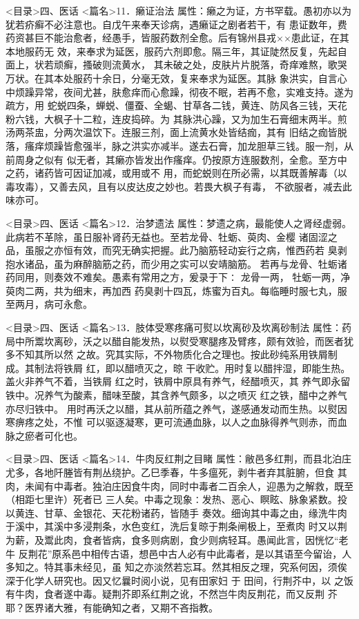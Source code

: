 \documentclass[a4paper,12pt,UTF8,twoside]{ctexbook}
\begin{document}
<目录>四、医话
<篇名>11．癞证治法
属性：癞之为证，方书罕载。愚初亦以为犹若疥癣不必注意也。自戊午来奉天诊病，遇癞证之剧者若干，有 
患证数年，费药资甚巨不能治愈者，经愚手，皆服药数剂全愈。后有锦州县戎××患此证，在其本地服药无 
效，来奉求为延医，服药六剂即愈。隔三年，其证陡然反复，先起自面上，状若顽癣，搔破则流黄水， 
其未破之处，皮肤片片脱落，奇痒难熬，歌哭万状。在其本处服药十余日，分毫无效，复来奉求为延医。其脉 
象洪实，自言心中烦躁异常，夜间尤甚，肤愈痒而心愈躁，彻夜不眠，若再不愈，实难支持。遂为疏方，用 
蛇蜕四条，蝉蜕、僵蚕、全蝎、甘草各二钱，黄连、防风各三钱，天花粉六钱，大枫子十二粒，连皮捣碎。为 
其脉洪心躁，又为加生石膏细末两半。煎汤两茶盅，分两次温饮下。连服三剂，面上流黄水处皆结痂，其有 
旧结之痂皆脱落，瘙痒烦躁皆愈强半，脉之洪实亦减半。遂去石膏，加龙胆草三钱。服一剂，从前周身之似有 
似无者，其癞亦皆发出作瘙痒。仍按原方连服数剂，全愈。至方中之药，诸药皆可因证加减，或用或不 
用，而蛇蜕则在所必需，以其既善解毒（以毒攻毒），又善去风，且有以皮达皮之妙也。若畏大枫子有毒， 
不欲服者，减去此味亦可。 

<目录>四、医话
<篇名>12．治梦遗法
属性：梦遗之病，最能使人之肾经虚弱。此病若不革除，虽日服补肾药无益也。至若龙骨、牡蛎、萸肉、金樱 
诸固涩之品，虽服之亦恒有效，而究无确实把握。此乃脑筋轻动妄行之病，惟西药若 
臭剥抱水诸品，虽为麻醉脑筋之药，而少用之实可以安靖脑筋。 
若再与龙骨、牡蛎诸药同用，则奏效不难矣。愚素有常用之方，爰录于下∶ 
龙骨一两， 牡蛎一两，净萸肉二两，共为细末，再加西 
药臭剥十四瓦，炼蜜为百丸。每临睡时服七丸，服至两月，病可永愈。 

<目录>四、医话
<篇名>13．肢体受寒疼痛可熨以坎离砂及坎离砂制法
属性：药局中所鬻坎离砂，沃之以醋自能发热，以熨受寒腿疼及臂疼，颇有效验，而医者犹多不知其所以然 
之故。究其实际，不外物质化合之理也。按此砂纯系用铁屑制成。其制法将铁屑 红，即以醋喷灭之，晾 
干收贮。用时复以醋拌湿，即能生热。盖火非养气不着，当铁屑 红之时，铁屑中原具有养气，经醋喷灭，其 
养气即永留铁中。况养气为酸素，醋味至酸，其含养气颇多，以之喷灭 红之铁，醋中之养气亦尽归铁中。 
用时再沃之以醋，其从前所蕴之养气，遂感通发动而生热。以熨因寒痹疼之处，不惟 
可以驱逐凝寒，更可流通血脉，以人之血脉得养气则赤，而血脉之瘀者可化也。 

<目录>四、医话
<篇名>14．牛肉反红荆之目睹
属性：敝邑多红荆，而县北泊庄尤多，各地阡塍皆有荆丛绕护。乙巳季春，牛多瘟死，剥牛者弃其脏腑，但食 
其肉，未闻有中毒者。独泊庄因食牛肉，同时中毒者二百余人，迎愚为之解救，既至（相距七里许）死者已 
三人矣。中毒之现象∶发热、恶心、瞑眩、脉象紧数。投以黄连、甘草、金银花、天花粉诸药，皆随手 
奏效。细询其中毒之由，缘洗牛肉于溪中，其溪中多浸荆条，水色变红，洗后复晾于荆条闸极上，至煮肉 
时又以荆为薪，及鬻此肉，食者皆病，食多则病剧，食少则病轻耳。愚闻此言，因恍忆“老牛 
反荆花”原系邑中相传古语，想邑中古人必有中此毒者，是以其语至今留诒，人多知之。特其事未经见，虽 
知之亦淡然若忘耳。然其相反之理，究系何因，须俟深于化学人研究也。因又忆曩时阅小说，见有田家妇 于 
田间，行荆芥中，以 之饭有牛肉，食者遂中毒。疑荆芥即系红荆之讹，不然岂牛肉反荆花，而又反荆 
芥耶？医界诸大雅，有能确知之者，又期不吝指教。 
\end{document}

